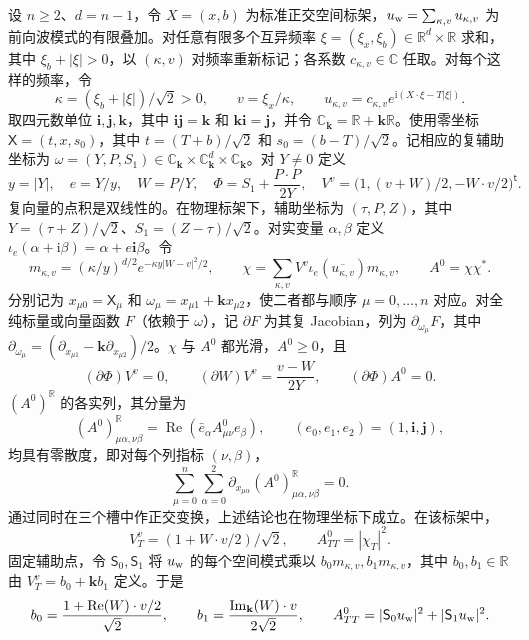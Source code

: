 设 $n\ge2$、$d=n-1$，令 $X=(x,b)$ 为标准正交空间标架，$u_{\rm w}=\sum_{\kappa,v}u_{\kappa,v}$ 为前向波模式的有限叠加。对任意有限多个互异频率 $\xi=(\xi_x,\xi_b)\in\mathbb R^d\times\mathbb R$ 求和，其中 $\xi_b+|\xi|>0$，以 $(\kappa,v)$ 对频率重新标记；各系数 $c_{\kappa,v}\in\mathbb C$ 任取。对每个这样的频率，令
\[
\kappa=(\xi_b+|\xi|)/\sqrt2>0,\qquad v=\xi_x/\kappa,\qquad
u_{\kappa,v}=c_{\kappa,v}e^{\mathrm i(X\cdot\xi-T|\xi|)}.
\]
取四元数单位 $\mathbf i,\mathbf j,\mathbf k$，其中 $\mathbf{ij}=\mathbf k$ 和 $\mathbf{ki}=\mathbf j$，并令 $\mathbb C_{\mathbf k}=\mathbb R+\mathbf k\mathbb R$。使用零坐标 $\mathsf X=(t,x,s_0)$，其中 $t=(T+b)/\sqrt2$ 和 $s_0=(b-T)/\sqrt2$。记相应的复辅助坐标为 $\omega=(Y,P,S_1)\in\mathbb C_{\mathbf k}\times\mathbb C_{\mathbf k}^d\times\mathbb C_{\mathbf k}$。对 $Y\ne0$ 定义
\[
y=|Y|,\quad e=Y/y,\quad W=P/Y,\quad
\Phi=S_1+\frac{P\cdot P}{2Y},\quad
V^v=\bigl(1,(v+W)/2,-W\cdot v/2\bigr)^{\mathsf t}.
\]
复向量的点积是双线性的。在物理标架下，辅助坐标为 $(\tau,P,Z)$，其中 $Y=(\tau+Z)/\sqrt2$、$S_1=(Z-\tau)/\sqrt2$。对实变量 $\alpha,\beta$ 定义 $\iota_e(\alpha+\mathrm i\beta)=\alpha+e\mathbf i\beta$。令
\[
m_{\kappa,v}=(\kappa/y)^{d/2}e^{-\kappa y|W-v|^2/2},\qquad
\chi=\sum_{\kappa,v} V^v\iota_e(\overline{u_{\kappa,v}})m_{\kappa,v},\qquad A^0=\chi\chi^* .
\]
分别记为 $x_{\mu0}=\mathsf X_\mu$ 和 $\omega_\mu=x_{\mu1}+\mathbf kx_{\mu2}$，使二者都与顺序 $\mu=0,\ldots,n$ 对应。对全纯标量或向量函数 $F$（依赖于 $\omega$），记 $\partial F$ 为其复 Jacobian，列为 $\partial_{\omega_\mu}F$，其中 $\partial_{\omega_\mu}=(\partial_{x_{\mu1}}-\mathbf k\partial_{x_{\mu2}})/2$。$\chi$ 与 $A^0$ 都光滑，$A^0\ge0$，且
\[
(\partial\Phi)V^v=0,\qquad
(\partial W)V^v=\frac{v-W}{2Y},\qquad
(\partial\Phi)A^0=0 .
\]
$(A^0)^\mathbb R$ 的各实列，其分量为
\[
(A^0)^\mathbb R_{\mu\alpha,\nu\beta}=\operatorname{Re}(\bar e_\alpha A^0_{\mu\nu}e_\beta),
\qquad (e_0,e_1,e_2)=(1,\mathbf i,\mathbf j),
\]
均具有零散度，即对每个列指标 $(\nu,\beta)$，
\[
 \sum_{\mu=0}^n\sum_{\alpha=0}^2
 \partial_{x_{\mu\alpha}}(A^0)^\mathbb R_{\mu\alpha,\nu\beta}=0.
\]
通过同时在三个槽中作正交变换，上述结论也在物理坐标下成立。在该标架中，
\[
V_T^v=(1+W\cdot v/2)/\sqrt2,\qquad A^0_{TT}=|\chi_T|^2.
\]
固定辅助点，令 $\mathsf S_0,\mathsf S_1$ 将 $u_{\rm w}$ 的每个空间模式乘以 $b_0m_{\kappa,v},b_1m_{\kappa,v}$，其中 $b_0,b_1\in\mathbb R$ 由 $V_T^v=b_0+\mathbf k b_1$ 定义。于是
\[
b_0=\frac{1+\operatorname{Re}(W)\cdot v/2}{\sqrt2},
\qquad
b_1=\frac{\operatorname{Im}_{\mathbf k}(W)\cdot v}{2\sqrt2},
\qquad A^0_{TT}=|\mathsf S_0u_{\rm w}|^2+|\mathsf S_1u_{\rm w}|^2.
\]
